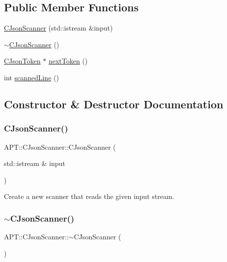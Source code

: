 \subsection*{Public Member Functions}
\begin{DoxyCompactItemize}
\item 
\hyperlink{classAPT_1_1CJsonScanner_a66b75b3be7d072f0b51b17399a372b4b}{C\+Json\+Scanner} (std\+::istream \&input)
\item 
\hyperlink{classAPT_1_1CJsonScanner_a3ddc04d78015157e8e52df2cd6317330}{$\sim$\+C\+Json\+Scanner} ()
\item 
\hyperlink{classAPT_1_1CJsonToken}{C\+Json\+Token} $\ast$ \hyperlink{classAPT_1_1CJsonScanner_afe3b93ec865d0a77c31df6966e6fc4e1}{next\+Token} ()
\item 
int \hyperlink{classAPT_1_1CJsonScanner_adf983e640d42df3a5796b9f2aa2df5c0}{scanned\+Line} ()
\end{DoxyCompactItemize}


\subsection{Constructor \& Destructor Documentation}
\mbox{\label{classAPT_1_1CJsonScanner_a66b75b3be7d072f0b51b17399a372b4b}} 
\subsubsection{\texorpdfstring{C\+Json\+Scanner()}{CJsonScanner()}}
{\footnotesize\ttfamily A\+P\+T\+::\+C\+Json\+Scanner\+::\+C\+Json\+Scanner (\begin{DoxyParamCaption}\item[{std\+::istream \&}]{input }\end{DoxyParamCaption})}

Create a new scanner that reads the given input stream. \mbox{\label{classAPT_1_1CJsonScanner_a3ddc04d78015157e8e52df2cd6317330}} 
\subsubsection{\texorpdfstring{$\sim$\+C\+Json\+Scanner()}{~CJsonScanner()}}
{\footnotesize\ttfamily A\+P\+T\+::\+C\+Json\+Scanner\+::$\sim$\+C\+Json\+Scanner (\begin{DoxyParamCaption}{ }\end{DoxyParamCaption})}

